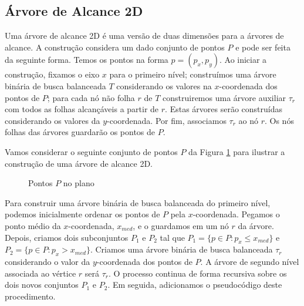 \subsection{Árvore de Alcance 2D}

Uma árvore de alcance 2D é uma versão de duas dimensões para a árvores de alcance. A construção considera um dado conjunto de pontos $P$ e pode ser feita da seguinte forma.
Temos os pontos na forma $p = (p_x, p_y)$. Ao iniciar a construção, fixamos o eixo $x$ para o primeiro nível; construímos uma árvore binária de busca balanceada $T$ considerando os valores na $x$-coordenada dos pontos de $P$; para cada nó não folha $r$ de $T$ construiremos uma árvore auxiliar $\tau_r$ com todos as folhas alcançáveis a partir de $r$. Estas árvores serão construídas considerando os valores da $y$-coordenada. Por fim, associamos $\tau_r$ ao nó $r$. Os nós folhas das árvores guardarão os pontos de $P$.

Vamos considerar o seguinte conjunto de pontos $P$ da Figura \ref{fig:9} para ilustrar a construção de uma árvore de alcance 2D.
\begin{figure}[H]
\centering
{}
\caption{Pontos $P$ no plano}
\label{fig:9}
\end{figure}

Para construir uma árvore binária de busca balanceada do primeiro nível, podemos inicialmente ordenar os pontos de $P$ pela %
$x$-coordenada. %
Pegamos o ponto médio da $x$-coordenada, $x_{med}$, e o guardamos em um nó $r$ da árvore. Depois, criamos dois subconjuntos $P_1$ e $P_2$ tal que $P_1 = \{p \in P : p_x \leq x_{med}\}$ e $P_2 = \{p \in P : p_x > x_{med}\}$. Criamos uma árvore binária de busca balanceada $\tau_r$ considerando o valor da $y$-coordenada dos pontos de $P$. A árvore de segundo nível associada ao vértice $r$ será $\tau_r$. O processo continua de forma recursiva sobre os dois novos conjuntos $P_1$ e $P_2$. Em seguida, adicionamos o pseudocódigo deste procedimento.

